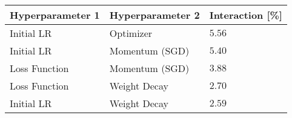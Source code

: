 \begin{tabular}{lll}
\toprule
Hyperparameter 1 & Hyperparameter 2 & Interaction [\%] \\
\midrule
Initial LR & Optimizer & $5.56$ \\
Initial LR & Momentum (SGD) & $5.40$ \\
Loss Function & Momentum (SGD) & $3.88$ \\
Loss Function & Weight Decay & $2.70$ \\
Initial LR & Weight Decay & $2.59$ \\
\bottomrule
\end{tabular}

